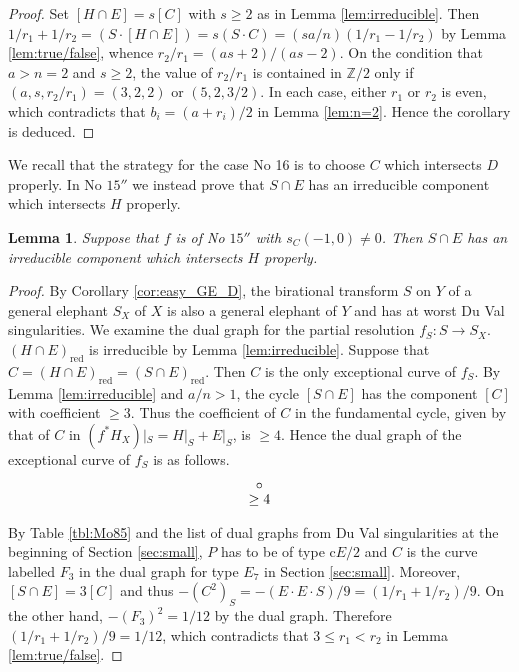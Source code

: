 \documentclass[a4paper,11pt]{amsart}
\newtheorem{lemma}[theorem]{Lemma}
\theoremstyle{definition}
\theoremstyle{remark}
\numberwithin{equation}{section}
\newcommand{\bZ}{{\mathbb Z}}
\newcommand{\red}{\mathrm{red}}
\begin{document}
\begin{proof}
Set $[H \cap E]=s[C]$ with $s\ge2$ as in Lemma \ref{lem:irreducible}.
Then $1/r_1+1/r_2=(S \cdot [H \cap E])=s(S \cdot C)=(sa/n)(1/r_1-1/r_2)$
by Lemma \ref{lem:true/false},
whence $r_2/r_1=(as+2)/(as-2)$.
On the condition that $a>n=2$ and $s\ge2$,
the value of $r_2/r_1$ is contained in $\bZ/2$
only if $(a,s,r_2/r_1)=(3,2,2)$ or $(5,2,3/2)$.
In each case,
either $r_1$ or $r_2$ is even,
which contradicts that $b_i=(a+r_i)/2$ in Lemma \ref{lem:n=2}.
Hence the corollary is deduced.
\end{proof}

We recall that the strategy for the case No 16 is
to choose $C$ which intersects $D$ properly.
In No $\textrm{15}''$
we instead prove that $S \cap E$ has an irreducible component
which intersects $H$ properly.

\begin{lemma}\label{lem:move_S}
Suppose that $f$ is of No $\textrm{15}''$ with $s_C(-1,0)\neq0$.
Then $S \cap E$ has an irreducible component which intersects $H$ properly.
\end{lemma}

\begin{proof}
By Corollary \ref{cor:easy_GE_D},
the birational transform $S$ on $Y$ of a general elephant $S_X$ of $X$
is also a general elephant of $Y$ and has at worst Du Val singularities.
We examine the dual graph for the partial resolution $f_S \colon S \to S_X$.
$(H \cap E)_\red$ is irreducible by Lemma \ref{lem:irreducible}.
Suppose that $C=(H \cap E)_\red=(S \cap E)_\red$.
Then $C$ is the only exceptional curve of $f_S$.
By Lemma \ref{lem:irreducible} and $a/n>1$,
the cycle $[S \cap E]$ has the component $[C]$ with coefficient $\ge3$.
Thus the coefficient of $C$ in the fundamental cycle,
given by that of $C$ in $(f^*H_X)|_S= H|_S+E|_S$, is $\ge4$.
Hence the dual graph of the exceptional curve of $f_S$ is as follows.
\begin{align*}
\xymatrix@!0@=30pt{
&
*=<3.5pt>{\circ} \ar@{}[r]_<*+{\!\!\ge4} &
}
\end{align*}
By Table \ref{tbl:Mo85} and
the list of dual graphs from Du Val singularities
at the beginning of Section \ref{sec:small},
$P$ has to be of type c$E/2$ and $C$ is the curve
labelled $F_3$ in the dual graph for type $E_7$ in Section \ref{sec:small}.
Moreover, $[S \cap E]=3[C]$ and thus
$-(C^2)_S=-(E \cdot E \cdot S)/9=(1/r_1+1/r_2)/9$.
On the other hand, $-(F_3)^2=1/12$ by the dual graph.
Therefore $(1/r_1+1/r_2)/9=1/12$,
which contradicts that $3\le r_1<r_2$ in Lemma \ref{lem:true/false}.
\end{proof}
\end{document}
